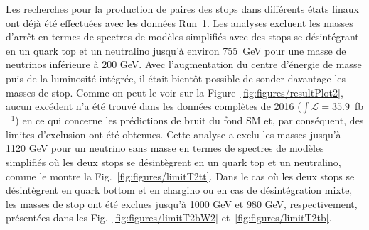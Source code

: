 
Les recherches pour la production de paires des stops dans différents états finaux ont déjà été effectuées avec les données Run~1. Les analyses excluent les masses d'arrêt en termes de spectres de modèles simplifiés avec des stops se désintégrant en un quark top et un neutralino jusqu'à environ 755~GeV pour une masse de neutrinos inférieure à 200 GeV. Avec l'augmentation du centre d'énergie de masse puis de la luminosité intégrée, il était bientôt possible de sonder davantage les masses de stop. Comme on peut le voir sur la Figure~\ref{fig:figures/resultPlot2}, aucun excédent n'a été trouvé dans les données complètes de 2016 ($ \int{\mathcal {L}} = 35.9 $~fb $^{-1} $) en ce qui concerne les prédictions de bruit du fond SM et, par conséquent, des limites d'exclusion ont été obtenues. Cette analyse a exclu les masses jusqu’à 1120 GeV pour un neutrino sans masse en termes de spectres de modèles simplifiés où les deux stops se désintègrent en un quark top et un neutralino, comme le montre la Fig.~\ref{fig:figures/limitT2tt}. Dans le cas où les deux stops se désintègrent en quark bottom et en chargino ou en cas de désintégration mixte, les masses de stop ont été exclues jusqu’à 1000 GeV et 980 GeV, respectivement, présentées dans les Fig.~\ref{fig:figures/limitT2bW2}  et~\ref{fig:figures/limitT2tb}.

